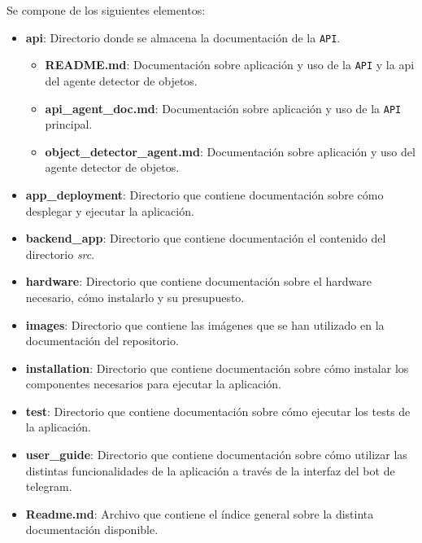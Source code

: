 Se compone de los siguientes elementos:

\vspace{-0.5cm}

\begin{itemize}
\item \textbf{api}: Directorio donde se almacena la documentación de la \texttt{API}.

	\begin{itemize}
	\item \textbf{README.md}: Documentación sobre aplicación y uso de la \texttt{API} y la api del agente detector de objetos.
	\item \textbf{api\_agent\_doc.md}: Documentación sobre aplicación y uso de la \texttt{API} principal.
	\item \textbf{object\_detector\_agent.md}: Documentación sobre aplicación y uso del agente detector de objetos.
	\end{itemize}

\item \textbf{app\_deployment}: Directorio que contiene documentación sobre cómo desplegar y ejecutar la aplicación.

\item \textbf{backend\_app}: Directorio que contiene documentación el contenido del directorio \textit{src}.

\item \textbf{hardware}: Directorio que contiene documentación sobre el hardware necesario, cómo instalarlo y su presupuesto.

\item \textbf{images}: Directorio que contiene las imágenes que se han utilizado en la documentación del repositorio.

\item \textbf{installation}: Directorio que contiene documentación sobre cómo instalar los componentes necesarios para ejecutar la aplicación.

\item \textbf{test}: Directorio que contiene documentación sobre cómo ejecutar los tests de la aplicación.

\item \textbf{user\_guide}: Directorio que contiene documentación sobre cómo utilizar las distintas funcionalidades de la aplicación a través de la interfaz del bot de telegram.

\item \textbf{Readme.md}: Archivo que contiene el índice general sobre la distinta documentación disponible.

\end{itemize}


